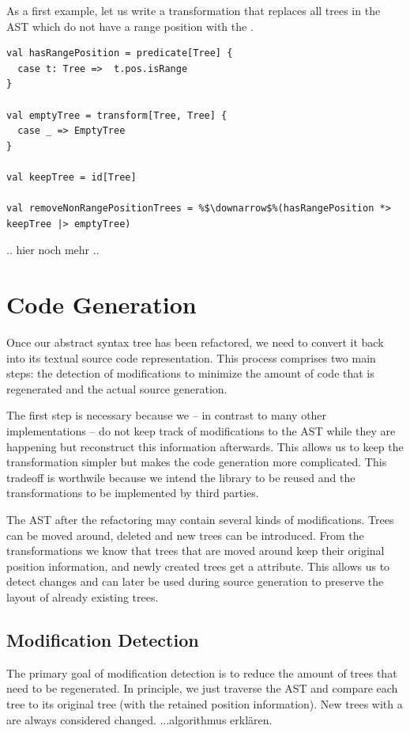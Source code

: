 \documentclass[10pt,a4paper,oneside]{scrreprt}
\begin{document}
As a first example, let us write a transformation that replaces all trees in the AST which do not have a range position with the .

\begin{lstlisting}
val hasRangePosition = predicate[Tree] {
  case t: Tree =>  t.pos.isRange
}

val emptyTree = transform[Tree, Tree] {
  case _ => EmptyTree
}

val keepTree = id[Tree]

val removeNonRangePositionTrees = %$\downarrow$%(hasRangePosition *> keepTree |> emptyTree)
\end{lstlisting}

.. hier noch mehr ..


\section{Code Generation}

Once our abstract syntax tree has been refactored, we need to convert it back into its textual source code representation. This process comprises two main steps: the detection of modifications to minimize the amount of code that is regenerated and the actual source generation.

The first step is necessary because we -- in contrast to many other implementations -- do not keep track of modifications to the AST while they are happening but reconstruct this information afterwards. This allows us to keep the transformation simpler but makes the code generation more complicated. This tradeoff is worthwile because we intend the library to be reused and the transformations to be implemented by third parties.

The AST after the refactoring may contain several kinds of modifications. Trees can be moved around, deleted and new trees can be introduced. From the transformations we know that trees that are moved around keep their original position information, and newly created trees get a  attribute. This allows us to detect changes and can later be used during source generation to preserve the layout of already existing trees. 

\subsection{Modification Detection}

The primary goal of modification detection is to reduce the amount of trees that need to be regenerated. In principle, we just traverse the AST and compare each tree to its original tree (with the retained position information). New trees with a  are always considered changed. ...algorithmus erklären.
\end{document}
